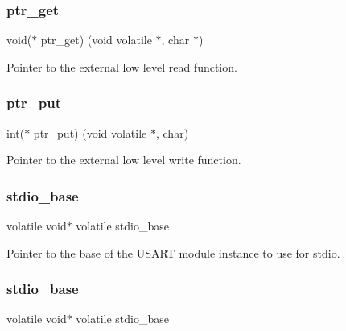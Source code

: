 \subsubsection{\texorpdfstring{ptr\_get}{ptr\_get}}
{\footnotesize\ttfamily void($\ast$ ptr\+\_\+get) (void volatile $\ast$, char $\ast$)}

Pointer to the external low level read function. \mbox{\label{group__group__common__utils__stdio_gab88750c764f1e24b95134201373aba70}} 
\subsubsection{\texorpdfstring{ptr\_put}{ptr\_put}}
{\footnotesize\ttfamily int($\ast$ ptr\+\_\+put) (void volatile $\ast$, char)}

Pointer to the external low level write function. \mbox{\label{group__group__common__utils__stdio_gad4163ee0eaa09db3b42c367fd768e737}} 
\subsubsection{\texorpdfstring{stdio\_base}{stdio\_base}\hspace{0.1cm}{\footnotesize\ttfamily [1/2]}}
{\footnotesize\ttfamily volatile void$\ast$ volatile stdio\+\_\+base}

Pointer to the base of the U\+S\+A\+RT module instance to use for stdio. \mbox{\label{group__group__common__utils__stdio_gad4163ee0eaa09db3b42c367fd768e737}} 
\subsubsection{\texorpdfstring{stdio\_base}{stdio\_base}\hspace{0.1cm}{\footnotesize\ttfamily [2/2]}}
{\footnotesize\ttfamily volatile void$\ast$ volatile stdio\+\_\+base}

